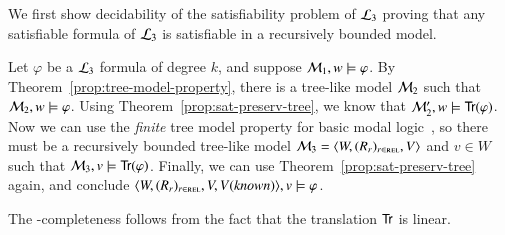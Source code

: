 \begin{pf}
We first show decidability of the satisfiability problem of 
$\mathcal{L}_3$ proving that any satisfiable formula of $\mathcal{L}_3$ is satisfiable in a
recursively bounded model.

Let $\varphi$ be a $\mathcal{L}_3$ formula of degree $k$, and suppose
$\mathcal{M}_1,w \models \varphi$. By
Theorem~\ref{prop:tree-model-property}, there is a tree-like
model $\mathcal{M}_2$ such that $\mathcal{M}_2,w \models \varphi$.
Using Theorem~\ref{prop:sat-preserv-tree}, we know that $\mathcal{M}_2',w \models
{\sf Tr}(\varphi)$. Now we can use the \emph{finite} tree model property for
basic modal logic~\cite{BRV01}, so there must be a recursively bounded tree-like
model $\mathcal{M}_3=\langle W,(R_r)_{r \in \textsc{rel}},V \rangle$ and $v \in W$ such that $\mathcal{M}_3,v \models {\sf Tr}(\varphi)$.
Finally, we can use Theorem~\ref{prop:sat-preserv-tree} again,
and conclude $\langle W,(R_r)_{r \in \textsc{rel}},V,V(\mathit{known}) \rangle,v \models \varphi$.
% 

The \pspace-completeness follows from the fact that the translation 
${\sf Tr}$ is linear.
\end{pf}




